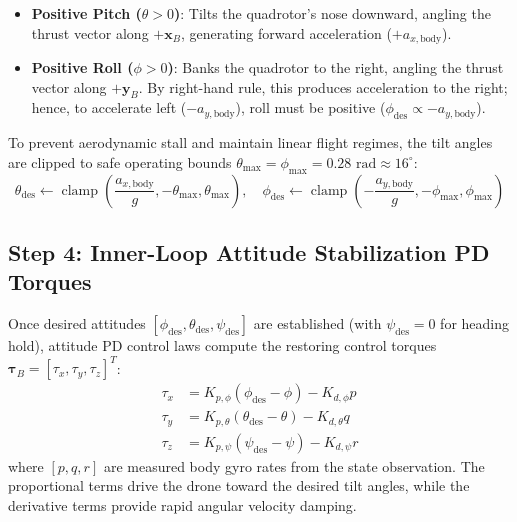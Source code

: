 \documentclass[11pt,a4paper]{article}
\begin{document}
\begin{tcolorbox}[title=Physical Intuition of Signs in Tilt Kinematics]
\begin{itemize}
    \item \textbf{Positive Pitch ($\theta > 0$)}: Tilts the quadrotor's nose downward, angling the thrust vector along $+\mathbf{x}_B$, generating forward acceleration ($+a_{x,\mathrm{body}}$).
    \item \textbf{Positive Roll ($\phi > 0$)}: Banks the quadrotor to the right, angling the thrust vector along $+\mathbf{y}_B$. By right-hand rule, this produces acceleration to the right; hence, to accelerate left ($-a_{y,\mathrm{body}}$), roll must be positive ($\phi_{\mathrm{des}} \propto -a_{y,\mathrm{body}}$).
\end{itemize}
\end{tcolorbox}

To prevent aerodynamic stall and maintain linear flight regimes, the tilt angles are clipped to safe operating bounds $\theta_{\max} = \phi_{\max} = 0.28\text{ rad} \approx 16^\circ$:
\begin{equation}
\theta_{\mathrm{des}} \leftarrow \operatorname{clamp}\left(\frac{a_{x,\mathrm{body}}}{g}, -\theta_{\max}, \theta_{\max}\right), \quad
\phi_{\mathrm{des}} \leftarrow \operatorname{clamp}\left(-\frac{a_{y,\mathrm{body}}}{g}, -\phi_{\max}, \phi_{\max}\right)
\end{equation}

\subsection{Step 4: Inner-Loop Attitude Stabilization PD Torques}
Once desired attitudes $[\phi_{\mathrm{des}}, \theta_{\mathrm{des}}, \psi_{\mathrm{des}}]$ are established (with $\psi_{\mathrm{des}} = 0$ for heading hold), attitude PD control laws compute the restoring control torques $\boldsymbol{\tau}_B = [\tau_x, \tau_y, \tau_z]^T$:
\begin{align}
\tau_x &= K_{p,\phi} (\phi_{\mathrm{des}} - \phi) - K_{d,\phi} p \label{eq:tau_x} \\
\tau_y &= K_{p,\theta} (\theta_{\mathrm{des}} - \theta) - K_{d,\theta} q \label{eq:tau_y} \\
\tau_z &= K_{p,\psi} (\psi_{\mathrm{des}} - \psi) - K_{d,\psi} r \label{eq:tau_z}
\end{align}
where $[p, q, r]$ are measured body gyro rates from the state observation. The proportional terms drive the drone toward the desired tilt angles, while the derivative terms provide rapid angular velocity damping.
\end{document}
